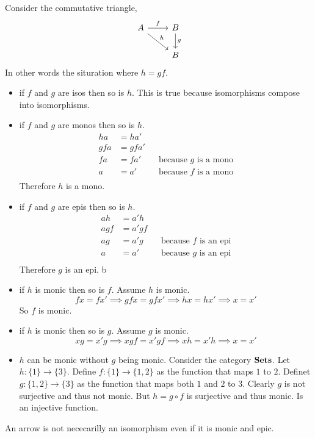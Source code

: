 \documentclass{book}
\theoremstyle{definition}
\newcommand{\arr}[3]{#1 : #2 \rightarrow #3}
\begin{document}
Consider the commutative triangle,
\[
  \begin{tikzcd}
    A \arrow[r, "f"] \arrow[dr, "h"] & B \arrow[d, "g"] \\
                                     & B
  \end{tikzcd}
\]
In other words the situration where $h = gf$.
\begin{itemize}
  \item if $f$ and $g$ are isos then so is $h$. This is true because
    isomorphisms compose into isomorphisms.
  \item if $f$ and $g$ are monos then so is $h$.
    \begin{align*}
      h a &= h a' \\
      g f a &= g f a' \\
      f a &= f a' && \text{because $g$ is a mono} \\
      a &= a' && \text{because $f$ is a mono} \\
    \end{align*}
    Therefore $h$ is a mono.
  \item if $f$ and $g$ are epis then so is $h$.
    \begin{align*}
      a h &= a' h \\
      a g f &= a' g f \\
      a g &= a' g && \text{because $f$ is an epi} \\
      a &= a' && \text{because $g$ is an epi} \\
    \end{align*}
    Therefore $g$ is an epi.
b  \item if $h$ is monic then so is $f$. Assume $h$ is monic.
    \[
      f x = f x' \implies g f x = g f x' \implies h x = h x' \implies x = x'
    \]
    So $f$ is monic.
  \item if $h$ is monic then so is $g$. Assume $g$ is monic. \[ x g = x' g
    \implies x g f = x' g f \implies x h = x' h \implies x = x' \]
  \item $h$ can be monic without $g$ being monic. Consider the category
    $\bf{Sets}$. Let $\arr{h}{\{1\}}{\{3\}}$. Define $\arr{f}{\{1\}}{\{1,2\}}$
    as the function that maps $1$ to $2$. Definet $\arr{g}{\{1,2\}}{\{3\}}$ as
    the function that maps both $1$ and $2$ to $3$. Clearly $g$ is not
    surjective and thus not monic. But $h = g \circ f$ is surjective and thus
    monic. Is an injective function.
\end{itemize}

An arrow is not nececarilly an isomorphism even if it is monic and epic.
\end{document}

